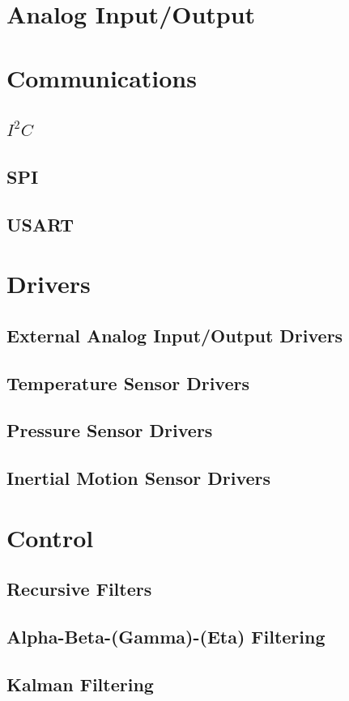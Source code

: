 \documentclass[10pt,letterpaper]{memoir} %
\newcommand{\iic}[0]{$I^{2}C$}
\begin{document}
\chapter{Analog Input/Output}

\chapter{Communications}
\section{\iic}
\section{SPI}
\section{USART}

\chapter{Drivers}
\section{External Analog Input/Output Drivers}
\section{Temperature Sensor Drivers}
\section{Pressure Sensor Drivers}
\section{Inertial Motion Sensor Drivers}

\chapter{Control}
\section{Recursive Filters}
\section{Alpha-Beta-(Gamma)-(Eta) Filtering}
\section{Kalman Filtering}
\end{document}
